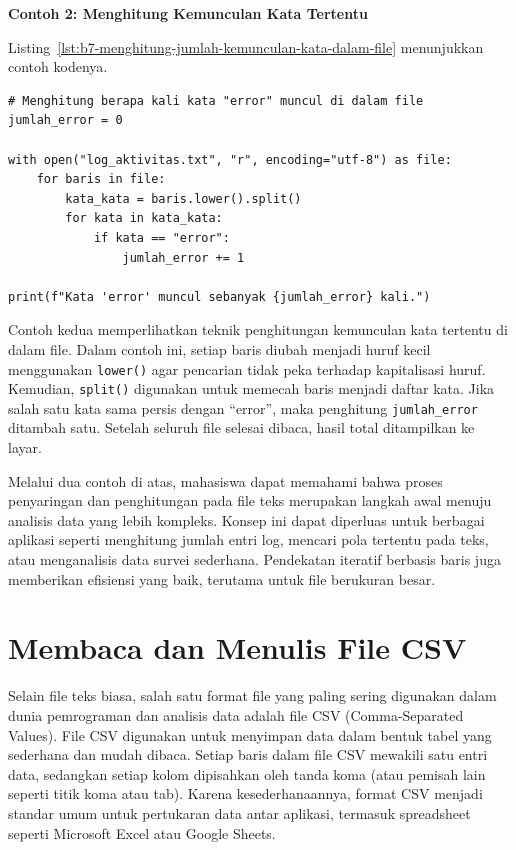 \noindent\textbf{Contoh 2: Menghitung Kemunculan Kata Tertentu}

Listing~\ref{lst:b7-menghitung-jumlah-kemunculan-kata-dalam-file} menunjukkan contoh kodenya.

\begin{lstlisting}[style=PythonStyle, caption={Menghitung jumlah kemunculan kata dalam file}, label={lst:b7-menghitung-jumlah-kemunculan-kata-dalam-file}]
# Menghitung berapa kali kata "error" muncul di dalam file
jumlah_error = 0

with open("log_aktivitas.txt", "r", encoding="utf-8") as file:
    for baris in file:
        kata_kata = baris.lower().split()
        for kata in kata_kata:
            if kata == "error":
                jumlah_error += 1

print(f"Kata 'error' muncul sebanyak {jumlah_error} kali.")
\end{lstlisting}

Contoh kedua memperlihatkan teknik penghitungan kemunculan kata tertentu di dalam file. Dalam contoh ini, setiap baris diubah menjadi huruf kecil menggunakan \texttt{lower()} agar pencarian tidak peka terhadap kapitalisasi huruf. Kemudian, \texttt{split()} digunakan untuk memecah baris menjadi daftar kata. Jika salah satu kata sama persis dengan “error”, maka penghitung \texttt{jumlah\_error} ditambah satu. Setelah seluruh file selesai dibaca, hasil total ditampilkan ke layar.

Melalui dua contoh di atas, mahasiswa dapat memahami bahwa proses penyaringan dan penghitungan pada file teks merupakan langkah awal menuju analisis data yang lebih kompleks. Konsep ini dapat diperluas untuk berbagai aplikasi seperti menghitung jumlah entri log, mencari pola tertentu pada teks, atau menganalisis data survei sederhana. Pendekatan iteratif berbasis baris juga memberikan efisiensi yang baik, terutama untuk file berukuran besar.


\section{Membaca dan Menulis File CSV}

Selain file teks biasa, salah satu format file yang paling sering digunakan dalam dunia pemrograman dan analisis data adalah file CSV (Comma-Separated Values). File CSV digunakan untuk menyimpan data dalam bentuk tabel yang sederhana dan mudah dibaca. Setiap baris dalam file CSV mewakili satu entri data, sedangkan setiap kolom dipisahkan oleh tanda koma (atau pemisah lain seperti titik koma atau tab). Karena kesederhanaannya, format CSV menjadi standar umum untuk pertukaran data antar aplikasi, termasuk spreadsheet seperti Microsoft Excel atau Google Sheets.

